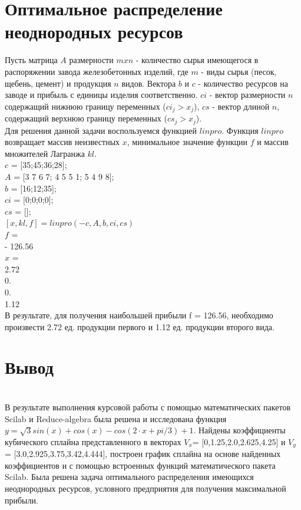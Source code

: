 \documentclass[russian, utf8, nocolumnxxxi, nocolumnxxxii, 14pt]{eskdtext}
\begin{document}
\section{Оптимальное распределение неоднородных ресурсов}
\indent Пусть матрица $A$ размерности $mxn$ - количество сырья имеющегося в распоряжении завода железобетонных изделий, где $m$ - виды сырья (песок, щебень, цемент) и продукция $n$ видов. Вектора $b$ и $c$ - количество ресурсов на заводе и прибыль $с$ единицы изделия соответственно. $ci$ - вектор размерности $n$ содержащий нижнюю границу переменных ($ci_j > x_j$), $cs$ - вектор длиной $n$, содержащий верхнюю границу переменных ($cs_j > x_j$).\\
Для решения данной задачи воспользуемся функцией $linpro$. Функция $linpro$ возвращает массив неизвестных $x$, минимальное значение функции $f$ и массив множителей Лагранжа $kl$.\\
$c$ = [35;45;36;28];\\
$A$ = [3 7 6 7; 4 5 5 1; 5 4 9 8];\\
$b$ = [16;12;35];\\
$ci$ = [0;0;0;0];\\
$cs$ = [];\\
$[x,kl,f]=linpro(-c,A,b,ci,cs)$\\
$f$  =\\
- 126.56 \\
$x$  =\\
2.72\\
0.\\
0.\\
1.12\\
\indent В результате, для получения наибольшей прибыли f = 126.56, необходимо произвести 2.72 ед. продукции первого и 1.12 ед. продукции второго вида.\\
\newpage
\section{Вывод}\\
В результате выполнения курсовой работы с помощью математических пакетов Scilab и Reduce-algebra была решена и исследована функция $y = \sqrt{3}sin(x) + cos(x) - cos(2 \cdot x + pi/3) + 1$. Найдены коэффициенты кубического сплайна представленного в векторах $V_x$= [0,1.25,2.0,2.625,4.25] и $V_y$= [3.0,2.925,3.75,3.42,4.444], построен график сплайна на основе найденных коэффициентов и с помощью встроенных функций математического пакета Scilab. Была решена задача оптимального распределения имеющихся неоднородных ресурсов, условного предприятия для получения максимальной прибыли.
\newpage
\end{document}
